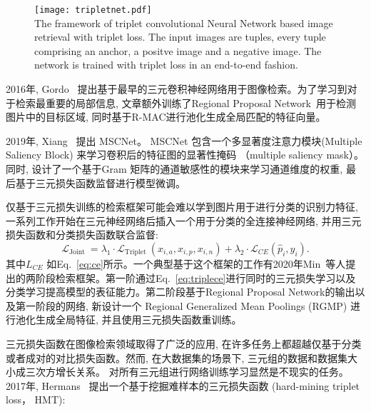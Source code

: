 \begin{figure}[!htp]
    \centering
    \texttt{[image: tripletnet.pdf]} \\
      {The framework of triplet convolutional Neural Network based image retrieval with triplet loss. The input images are tuples, every tuple comprising an anchor, a positve image and a negative image. The network is trained with triplet loss in an end-to-end fashion.}
   \label{fig:tripletnet}
\end{figure}
2016年, Gordo~\cite{gordo2016deep, gordo2017end} 提出基于最早的三元卷积神经网络用于图像检索。为了学习到对于检索最重要的局部信息, 文章额外训练了Regional Proposal Network~\cite{ren2015faster}用于检测图片中的目标区域, 同时基于R-MAC进行池化生成全局匹配的特征向量。\par
2019年, Xiang~\cite{xiang2019multiple} 提出 MSCNet。 MSCNet 包含一个多显著度注意力模块(Multiple Saliency Block) 来学习卷积后的特征图的显著性掩码 （multiple saliency mask）。同时, 设计了一个基于Gram 矩阵的通道敏感性的模块来学习通道维度的权重, 最后基于三元损失函数监督进行模型微调。\par
仅基于三元损失训练的检索框架可能会难以学到图片用于进行分类的识别力特征, 一系列工作开始在三元神经网络后插入一个用于分类的全连接神经网络, 并用三元损失函数和分类损失函数联合监督:
\begin{equation}
    \mathcal{L}_{\text {Joint }}=\lambda_1 \cdot \mathcal{L}_{\text {Triplet }}\left(x_{i, a}, x_{i, p}, x_{i, n}\right)+\lambda_2 \cdot \mathcal{L}_{C E}\left(\hat{p}_i, y_i\right).
    \label{eq:triplece}
\end{equation}
其中$L_{CE}$ 如Eq.~\ref{eq:ce}所示。一个典型基于这个框架的工作有2020年Min~\cite{min2020two}等人提出的两阶段检索框架。第一阶通过Eq.~\ref{eq:triplece}进行同时的三元损失学习以及分类学习提高模型的表征能力。第二阶段基于Regional Proposal Network的输出以及第一阶段的网络, 新设计一个 Regional Generalized Mean Poolings (RGMP) 进行池化生成全局特征, 并且使用三元损失函数重训练。\par
三元损失函数在图像检索领域取得了广泛的应用, 在许多任务上都超越仅基于分类或者成对的对比损失函数。然而, 在大数据集的场景下, 三元组的数据和数据集大小成三次方增长关系。 对所有三元组进行网络训练学习显然是不现实的任务。 2017年, Hermans~\cite{hermans2017defense} 提出一个基于挖掘难样本的三元损失函数 (hard-mining triplet loss， HMT):
